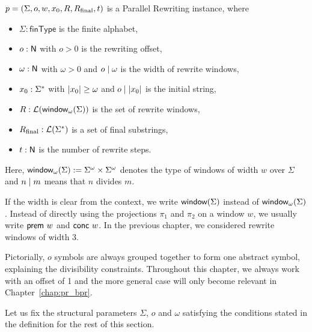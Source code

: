 \begin{definition}\label{def:pr}
  $p = (\Sigma, o, w, x_0, R, R_{\text{final}}, t)$ is a Parallel Rewriting instance, where 
  \begin{itemize}
    \item $\Sigma : \textsf{finType}$ is the finite alphabet,
    \item $o : \mathsf{N}$ with $o > 0$ is the rewriting offset,
    \item $\omega : \mathsf{N}$ with $\omega > 0$ and $o \mid \omega$ is the width of rewrite windows,
    \item $x_0 : \Sigma^*$ with $|x_0| \ge \omega$ and $o \mid |x_0|$ is the initial string, 
    \item $R : \mathcal{L} (\textsf{window}_{\omega}{(\Sigma)})$ is the set of rewrite windows,
    \item $R_{\text{final}} : \mathcal{L} (\Sigma^*)$ is a set of final substrings,
    \item $t : \mathsf{N}$ is the number of rewrite steps.
  \end{itemize}
  Here, $\textsf{window}_{\omega}{(\Sigma)} := {\Sigma}^\omega \times {\Sigma}^\omega$\mnote{$\winw{\omega}{\Sigma}$} denotes the type of windows of width $w$ over $\Sigma$ and $ n \mid{} m$ means that $n$ divides $m$.
\end{definition}
If the width is clear from the context, we write $\textsf{window}{(\Sigma)}$ instead of $\winw{\omega}{\Sigma}$.
Instead of directly using the projections $\pi_1$ and $\pi_2$ on a window $w$, we usually write $\textsf{prem}~w$ and $\textsf{conc}~w$. In the previous chapter, we considered rewrite windows of width 3.

Pictorially, $o$ symbols are always grouped together to form one abstract symbol, explaining the divisibility constraints. Throughout this chapter, we always work with an offset of 1 and the more general case will only become relevant in Chapter~\ref{chap:pr_bpr}.

Let us fix the structural parameters $\Sigma$, $o$ and $\omega$ satisfying the conditions stated in the definition for the rest of this section.


